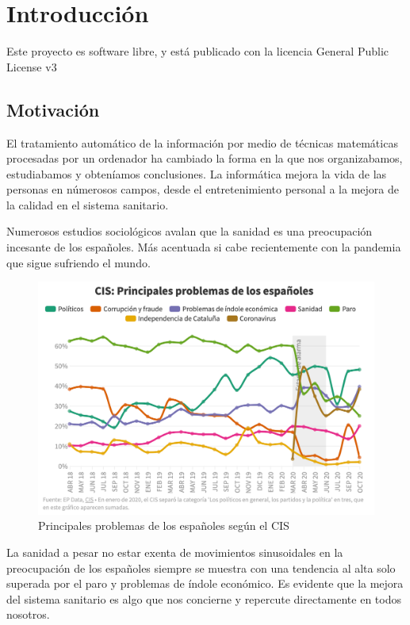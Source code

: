 \chapter{Introducción}
Este proyecto es software libre, y está publicado con la licencia \cite{gplv3} General Public License v3

\section{Motivación} 
El tratamiento automático de la información por medio de técnicas matemáticas procesadas por un ordenador ha cambiado la forma en la 
que nos organizabamos, estudiabamos y obteníamos conclusiones. La informática mejora la vida de las personas en númerosos campos, 
desde el entretenimiento personal a la mejora de la calidad en el sistema sanitario.

Numerosos estudios sociológicos avalan que la sanidad es una preocupación incesante de los españoles. Más acentuada si cabe recientemente
con la pandemia que sigue sufriendo el mundo.
\begin{figure}[]
	\centering	
	\includegraphics[scale=0.5]{logos/imgs/CIS_1.png}
	\caption{ \cite{rtve-cis}  Principales problemas de los españoles según el CIS }
    \label{fig:worst_f_value}
\end{figure}

La sanidad a pesar no estar exenta de movimientos sinusoidales en la preocupación de los españoles
siempre se muestra con una tendencia al alta solo superada por el paro y problemas de índole económico. 
Es evidente que la mejora del sistema sanitario es algo que nos concierne y repercute directamente en todos nosotros.

